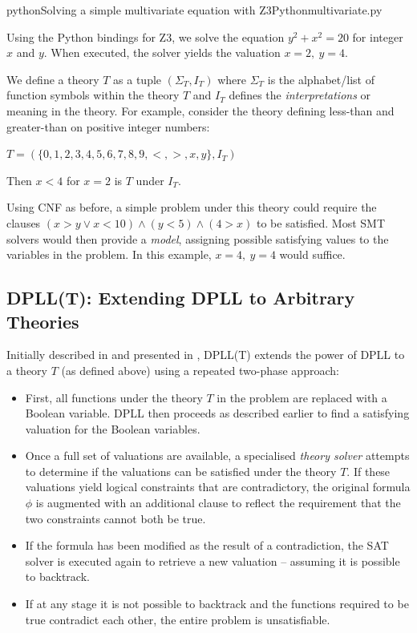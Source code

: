 \documentclass[a4paper,openany,12pt]{book}
\begin{document}
\begin{mycodefile}{python}{\label{code:z3:1}Solving a simple multivariate equation with Z3}{Python}{multivariate.py}

    Using the Python bindings for Z3, we solve the equation $y^2 + x^2 = 20$ for integer $x$ and $y$.
    When executed, the solver yields the valuation $x = 2,~y = 4$.

    \vspace{0.5em}
\end{mycodefile}

We define a theory $T$ as a tuple $(\Sigma_T, I_T)$ where $\Sigma_T$ is the alphabet/list of function symbols within
the theory $T$ and $I_T$ defines the \emph{interpretations} or meaning in the theory.
For example, consider the theory defining less-than and greater-than on positive integer numbers:

\(
T = (\{0,1,2,3,4,5,6,7,8,9,<,>,x,y\}, I_T)
\)

Then $x < 4$ for $x = 2$ is $T$ under $I_T$.

Using CNF as before, a simple problem under this theory could require the clauses $(x > y \lor x < 10) \land (y < 5)
\land (4 > x)$ to be satisfied.
Most SMT solvers would then provide a \emph{model}, assigning possible satisfying values to the variables in the
problem.
In this example, $x = 4,~y=4$ would suffice.


\subsection{DPLL(T): Extending DPLL to Arbitrary Theories}
\label{dpllt}
Initially described in \citet{ganzinger2004dpll} and presented in \citet{russell2016artificial}, DPLL(T) extends the
power of DPLL to a theory $T$ (as defined above) using a repeated two-phase approach:

\begin{itemize}
    \item First, all functions under the theory $T$ in the problem are replaced with a Boolean variable.
          DPLL then proceeds as described earlier to find a satisfying valuation for the Boolean variables.
    \item Once a full set of valuations are available, a specialised \emph{theory solver} attempts to determine if the
          valuations can be satisfied under the theory $T$.
          If these valuations yield logical constraints that are contradictory, the original formula $\phi$ is augmented
          with an additional clause to reflect the requirement that the two constraints cannot both be true.
    \item If the formula has been modified as the result of a contradiction, the SAT solver is executed again to
          retrieve a new valuation -- assuming it is possible to backtrack.
    \item If at any stage it is not possible to backtrack and the functions required to be true contradict each other,
          the entire problem is unsatisfiable.
\end{itemize}
\end{document}
